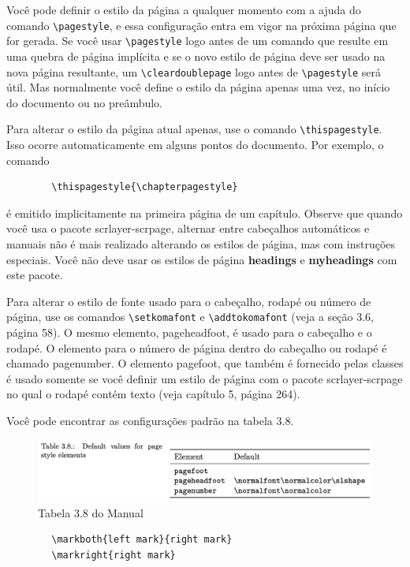 Você pode definir o estilo da página a qualquer momento com a ajuda do comando \verb|\pagestyle|, e essa configuração entra em vigor na próxima página que for gerada. Se você usar \verb|\pagestyle| logo antes de um comando que resulte em uma quebra de página implícita e se o novo estilo de página deve ser usado na nova página resultante, um \verb|\cleardoublepage| logo antes de \verb|\pagestyle| será útil. Mas normalmente você define o estilo da página apenas uma vez, no início do documento ou no preâmbulo.

Para alterar o estilo da página atual apenas, use o comando \verb|\thispagestyle|. Isso ocorre automaticamente em alguns pontos do documento. Por exemplo, o comando
\begin{verbatim}
        \thispagestyle{\chapterpagestyle}   
\end{verbatim}

é emitido implicitamente na primeira página de um capítulo.
Observe que quando você usa o pacote scrlayer-scrpage, alternar entre cabeçalhos automáticos e manuais não é mais realizado alterando os estilos de página, mas com instruções especiais. Você não deve usar os estilos de página \textbf{headings} e \textbf{myheadings} com este pacote.

Para alterar o estilo de fonte usado para o cabeçalho, rodapé ou número de página, use os comandos \verb|\setkomafont| e \verb|\addtokomafont| (veja a seção 3.6, página 58). O mesmo elemento, pageheadfoot, é usado para o cabeçalho e o rodapé. O elemento para o número de página dentro do cabeçalho ou rodapé é chamado pagenumber. O elemento pagefoot, que também é fornecido pelas classes \KOMAScript é usado somente se você definir um estilo de página com o pacote scrlayer-scrpage no qual o rodapé contém texto (veja capítulo 5, página 264).

Você pode encontrar as configurações padrão na tabela 3.8.

\begin{figure}[h]
    \centering
    \includegraphics[width=0.8\linewidth]{tab3_8.png}
    \caption{Tabela 3.8 do Manual}
    \label{fig:tab3_8}
\end{figure}

\begin{verbatim}
        \markboth{left mark}{right mark}
        \markright{right mark}
\end{verbatim}

